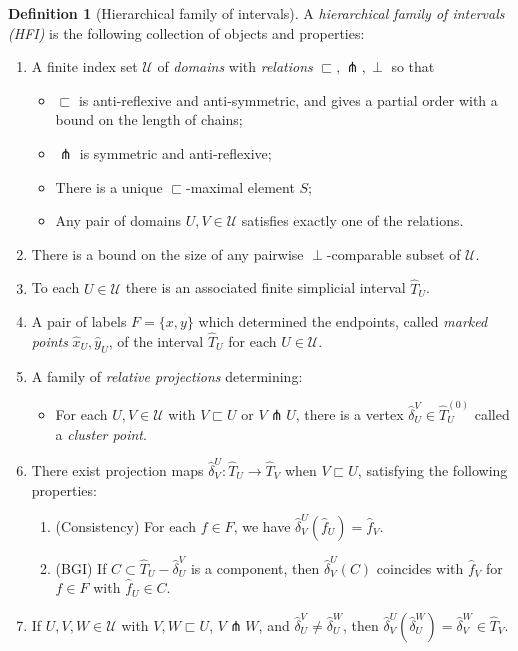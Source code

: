 \documentclass{amsart}
\theoremstyle{definition}
\newtheorem{definition}[theorem]{Definition}
\theoremstyle{remark}
\theoremstyle{definition}
\newcommand{\calU}{\mathcal{U}}
\newcommand{\hT}{\widehat{T}}
\newcommand{\hx}{\hat{x}}
\newcommand{\hy}{\hat{y}}
\newcommand{\hd}{\hat{\delta}}
\newcommand{\hf}{\hat{f}}
\newcommand{\nest}{\sqsubset}
\begin{document}
\begin{definition}[Hierarchical family of intervals] \label{defn:HFI}
A \emph{hierarchical family of intervals (HFI)} is the following collection of objects and properties:

\begin{enumerate}
\item A finite index set $\calU$ of \emph{domains} with \emph{relations} $\nest, \pitchfork, \perp$ so that
\begin{itemize}
    \item $\nest$ is anti-reflexive and anti-symmetric, and gives a partial order with a bound on the length of chains;
    \item $\pitchfork$ is symmetric and anti-reflexive;
    \item There is a unique $\nest$-maximal element $S$;
    \item Any pair of domains $U,V \in \calU$ satisfies exactly one of the relations. 
\end{itemize}
\item There is a bound on the size of any pairwise $\perp$-comparable subset of $\calU$. \label{item:finite dim}
\item To each $U \in \calU$ there is an associated finite simplicial interval $\hT_U$. \label{item:simplicial}
\item A pair of labels $F = \{x,y\}$ which determined the endpoints, called \emph{marked points} $\hx_U, \hy_U$, of the interval $\hT_U$ for each $U \in \calU$.
\item A family of \emph{relative projections} determining:
\begin{itemize}
    \item For each $U, V \in \calU$ with $V \nest U$ or $V \pitchfork U$, there is a vertex $\hd^V_U \in \hT^{(0)}_U$ called a \emph{cluster point}.
 
\end{itemize}
    \item There exist projection maps $\hd^U_V: \hT_U \to \hT_V$ when $V \nest U$, satisfying the following properties:\label{item:BGI HFI}
    \begin{enumerate}
    	\item (Consistency) For each $f \in F$, we have $\hd^U_V(\hf_U) = \hf_V$.
        \item (BGI) If $C \subset \hT_U - \hd^V_U$ is a component, then $\hd^U_V(C)$ coincides with $\hf_V$ for $f \in F$ with $\hf_U \in C$. 
    \end{enumerate}

\item If $U,V,W \in \calU$ with $V,W \nest U$, $V \pitchfork W$, and $\hd^V_U \neq \hd^W_U$, then $\hd^U_V(\hd^W_U) = \hd^W_V \in \hT_V$. \label{item:delta control HFI}
\end{enumerate}
\end{definition}
\end{document}
